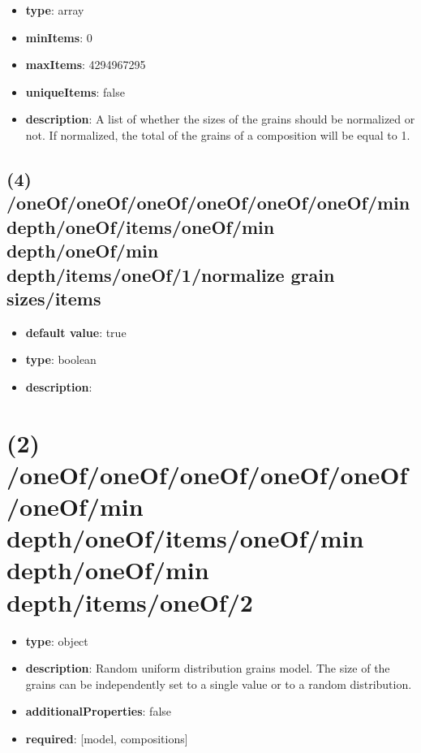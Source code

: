 \begin{itemize}[leftmargin=3em]\item {\bf type}: array
\item {\bf minItems}: 0
\item {\bf maxItems}: 4294967295
\item {\bf uniqueItems}: false
\item {\bf description}: A list of whether the sizes of the grains should be normalized or not. If normalized, the total of the grains of a composition will be equal to 1.
\end{itemize}\subsection{(4) /oneOf/oneOf/oneOf/oneOf/oneOf/oneOf/min depth/oneOf/items/oneOf/min depth/oneOf/min depth/items/oneOf/1/normalize grain sizes/items}
\begin{itemize}[leftmargin=4em]\item {\bf default value}: true
\item {\bf type}: boolean
\item {\bf description}: 
\end{itemize}\section{(2) /oneOf/oneOf/oneOf/oneOf/oneOf/oneOf/min depth/oneOf/items/oneOf/min depth/oneOf/min depth/items/oneOf/2}
\begin{itemize}[leftmargin=2em]\item {\bf type}: object
\item {\bf description}: Random uniform distribution grains model. The size of the grains can be independently set to a single value or to a random distribution.
\item {\bf additionalProperties}: false
\item {\bf required}: [model, compositions]\end{itemize}
